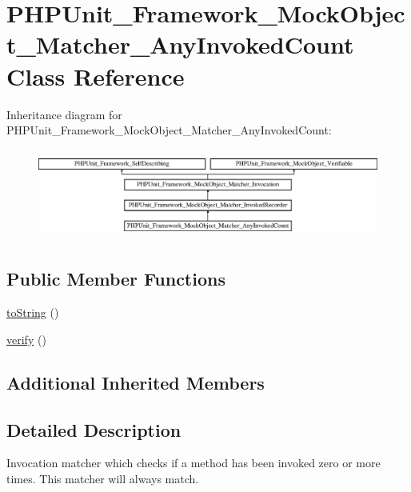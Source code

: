 \hypertarget{class_p_h_p_unit___framework___mock_object___matcher___any_invoked_count}{}\section{P\+H\+P\+Unit\+\_\+\+Framework\+\_\+\+Mock\+Object\+\_\+\+Matcher\+\_\+\+Any\+Invoked\+Count Class Reference}
\label{class_p_h_p_unit___framework___mock_object___matcher___any_invoked_count}
Inheritance diagram for P\+H\+P\+Unit\+\_\+\+Framework\+\_\+\+Mock\+Object\+\_\+\+Matcher\+\_\+\+Any\+Invoked\+Count\+:\begin{figure}[H]
\begin{center}
\leavevmode
\includegraphics[height=3.010753cm]{class_p_h_p_unit___framework___mock_object___matcher___any_invoked_count}
\end{center}
\end{figure}
\subsection*{Public Member Functions}
\begin{DoxyCompactItemize}
\item 
\mbox{\hyperlink{class_p_h_p_unit___framework___mock_object___matcher___any_invoked_count_a5558c5d549f41597377fa1ea8a1cefa3}{to\+String}} ()
\item 
\mbox{\hyperlink{class_p_h_p_unit___framework___mock_object___matcher___any_invoked_count_aa33600b6a1b28d0c4dfe4d468272aaa4}{verify}} ()
\end{DoxyCompactItemize}
\subsection*{Additional Inherited Members}


\subsection{Detailed Description}
Invocation matcher which checks if a method has been invoked zero or more times. This matcher will always match.


